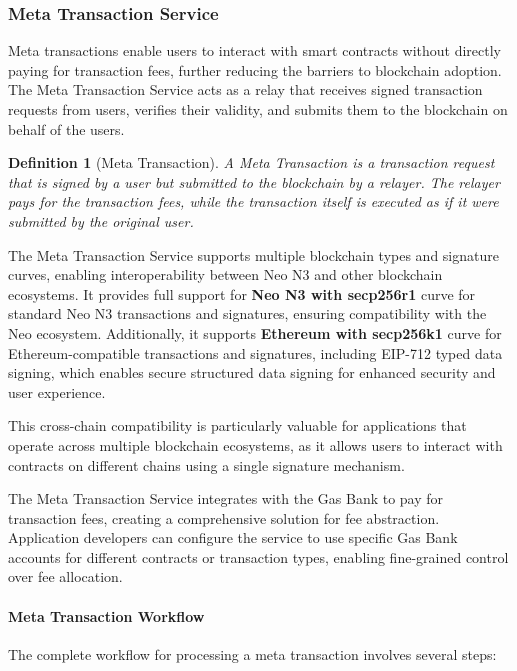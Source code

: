 \documentclass{article}
\newtheorem{definition}{Definition}
\begin{document}
\subsubsection{Meta Transaction Service}
\label{subsubsec:meta-tx}

Meta transactions enable users to interact with smart contracts without directly paying for transaction fees, further reducing the barriers to blockchain adoption. The Meta Transaction Service acts as a relay that receives signed transaction requests from users, verifies their validity, and submits them to the blockchain on behalf of the users.



\begin{definition}[Meta Transaction]
A Meta Transaction is a transaction request that is signed by a user but submitted to the blockchain by a relayer. The relayer pays for the transaction fees, while the transaction itself is executed as if it were submitted by the original user.
\end{definition}

The Meta Transaction Service supports multiple blockchain types and signature curves, enabling interoperability between Neo N3 and other blockchain ecosystems. It provides full support for \textbf{Neo N3 with secp256r1} curve for standard Neo N3 transactions and signatures, ensuring compatibility with the Neo ecosystem. Additionally, it supports \textbf{Ethereum with secp256k1} curve for Ethereum-compatible transactions and signatures, including EIP-712 typed data signing, which enables secure structured data signing for enhanced security and user experience.

This cross-chain compatibility is particularly valuable for applications that operate across multiple blockchain ecosystems, as it allows users to interact with contracts on different chains using a single signature mechanism.

The Meta Transaction Service integrates with the Gas Bank to pay for transaction fees, creating a comprehensive solution for fee abstraction. Application developers can configure the service to use specific Gas Bank accounts for different contracts or transaction types, enabling fine-grained control over fee allocation.



\paragraph{Meta Transaction Workflow}
The complete workflow for processing a meta transaction involves several steps:
\end{document}

